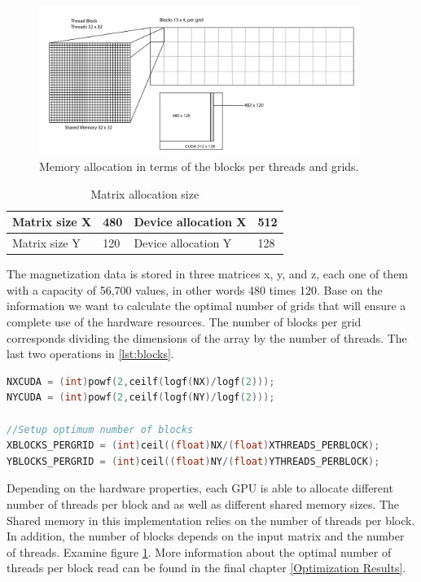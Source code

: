 \begin{figure}[htbp]
	\centering
		\includegraphics[width=0.93\textwidth]{Figures/block.png}
		\smallskip
	\caption[Grid layout]{Memory allocation in terms of the blocks per threads and grids.}
	\label{fig:block}
\end{figure}


\begin{table}[h]
\centering
\begin{tabular}{| l | l | l | l | }
\hline
Matrix size X & 480 & Device allocation X & 512\\
\hline
Matrix size Y & 120 & Device allocation Y & 128 \\
\hline
\end{tabular}
\caption{Matrix allocation size}
\label{tab:cuda}
\end{table}

The magnetization data is stored in three matrices x, y, and z, each one of them with a capacity of 56,700 values, in other words 480 times 120. Base on the information we want to calculate the optimal number of grids that will ensure a complete use of the hardware resources. The number of blocks per grid corresponds dividing the dimensions of the array by the number of threads. The last two operations in \ref{lst:blocks}.

\begin{lstlisting}[language=C++, label={lst:blocks}, caption={Device capacity calculation and number of block per grid}]	
NXCUDA = (int)powf(2,ceilf(logf(NX)/logf(2)));
NYCUDA = (int)powf(2,ceilf(logf(NY)/logf(2)));

//Setup optimum number of blocks
XBLOCKS_PERGRID = (int)ceil((float)NX/(float)XTHREADS_PERBLOCK); 
YBLOCKS_PERGRID = (int)ceil((float)NY/(float)YTHREADS_PERBLOCK);
\end{lstlisting}

Depending on the hardware properties, each GPU is able to allocate different number of threads per block and as well as different shared memory sizes. The Shared memory in this implementation relies on the number of threads per block. In addition, the number of blocks depends on the input matrix and the number of threads. Examine figure \ref{fig:block}. More information about the optimal number of threads per block read can be found in the final chapter \ref{Optimization Results}. 

